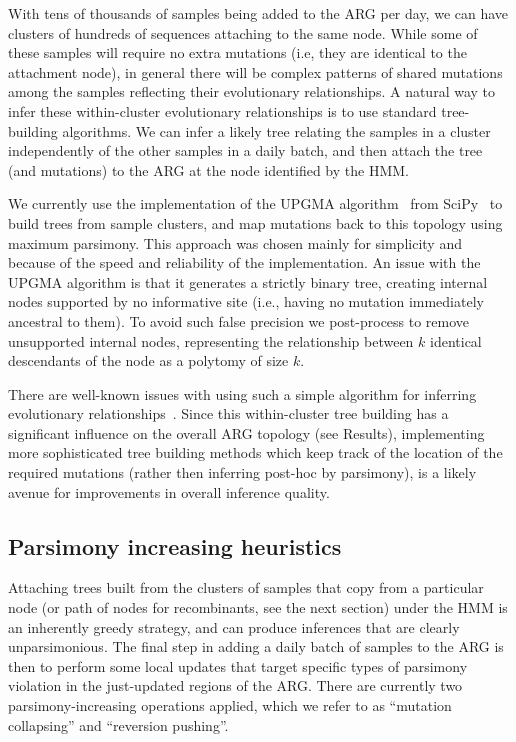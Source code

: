 \documentclass{article}
\begin{document}
With tens of thousands of samples being added to the ARG per day,
we can have clusters of hundreds of sequences attaching to the same node.
While some of these samples will require no extra mutations
(i.e, they are identical to the attachment node), in general there
will be complex patterns of shared mutations among the samples
reflecting their evolutionary relationships. A natural way to infer
these within-cluster evolutionary relationships is to use standard
tree-building algorithms.
We can infer a likely tree relating the
samples in a cluster independently of the other samples in a
daily batch, and then attach the tree (and mutations)
to the ARG at the node identified by the HMM.

We currently use the implementation of the UPGMA algorithm~\citep{Michener1957-tr}
from SciPy~\citep{Pauli2020-scipy} to build trees from sample
clusters, and map mutations back to this topology using maximum parsimony.
This approach was chosen mainly for simplicity and because of the
speed and reliability of the implementation.
An issue with the UPGMA algorithm is that it generates a strictly
binary tree, creating internal nodes
supported by no informative site (i.e., having no mutation immediately
ancestral to them). To avoid such false precision we post-process
to remove unsupported internal nodes, representing the relationship
between $k$ identical descendants of the node as a polytomy of size $k$.

There are well-known issues with using such a simple algorithm for inferring
evolutionary relationships~\citep{Felsenstein2004-inferring}.
Since this within-cluster tree building has a significant influence on the
overall ARG topology (see Results), implementing more sophisticated
tree building methods which keep track of the location of the required mutations
(rather then inferring post-hoc by parsimony), is a likely avenue
for improvements in overall inference quality.

\subsection{Parsimony increasing heuristics}
\label{sec:parsimony-heuristics}
Attaching trees built from the clusters of samples that copy from
a particular node (or path of nodes for recombinants, see the
next section) under the HMM is an inherently greedy strategy,
and can produce inferences that are clearly unparsimonious.
The final step in adding a daily batch of samples to the ARG
is then to perform some local updates that target specific
types of parsimony violation in the just-updated regions of the
ARG. There are currently two parsimony-increasing operations
applied, which we refer to as ``mutation collapsing'' and ``reversion
pushing''.
\end{document}
